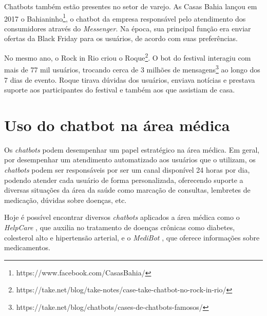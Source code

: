   Chatbots também estão presentes no setor de varejo. As Casas Bahia lançou em 2017 o Bahianinho\footnote{https://www.facebook.com/CasasBahia/}, o chatbot da empresa responsável pelo atendimento dos consumidores através do \textit{Messenger}. Na época, sua principal função era enviar ofertas da Black Friday para os usuários, de acordo com suas preferências.
  
  No mesmo ano, o Rock in Rio criou o Roque\footnote{https://take.net/blog/take-notes/case-take-chatbot-no-rock-in-rio/}. O bot do festival interagiu com mais de 77 mil usuários, trocando cerca de 3 milhões de mensagens\footnote{https://take.net/blog/chatbots/cases-de-chatbots-famosos/} ao longo dos 7 dias de evento. Roque tirava dúvidas dos usuários, enviava notícias e prestava suporte aos participantes do festival e também aos que assistiam de casa.
  
  \section{Uso do chatbot na área médica}
  Os \textit{chatbots} podem desempenhar um papel estratégico na área médica. Em geral, por desempenhar um atendimento automatizado aos usuários que o utilizam, os \textit{chatbots} podem ser responsáveis por ser um canal disponível 24 horas por dia, podendo atender cada usuário de forma personalizada, oferecendo suporte a diversas situações da área da saúde como marcação de consultas, lembretes de medicação, dúvidas sobre doenças, etc.
  
  Hoje é possível encontrar diversos \textit{chatbots} aplicados a área médica como o \emph{HelpCare} \cite{helpcare}, que auxilia no tratamento de doenças crônicas como diabetes, colesterol alto e hipertensão arterial, e o \emph{MediBot} \cite{medibot}, que oferece informações sobre medicamentos.
  
